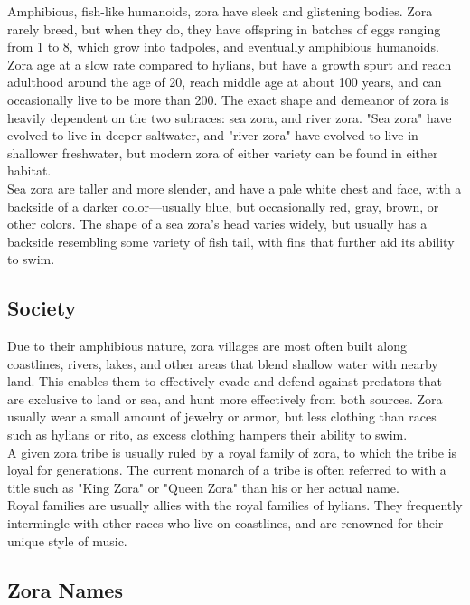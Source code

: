\documentclass[10pt,twoside,twocolumn,openany]{book}
\begin{document}
Amphibious, fish-like humanoids, zora have sleek and glistening bodies. Zora rarely breed, but when they do, they have offspring in batches of eggs ranging from 1 to 8, which grow into tadpoles, and eventually amphibious humanoids. Zora age at a slow rate compared to hylians, but have a growth spurt and reach adulthood around the age of 20, reach middle age at about 100 years, and can occasionally live to be more than 200.
The exact shape and demeanor of zora is heavily dependent on the two subraces: sea zora, and river zora. "Sea zora" have evolved to live in deeper saltwater, and "river zora" have evolved to live in shallower freshwater, but modern zora of either variety can be found in either habitat.\\
Sea zora are taller and more slender, and have a pale white chest and face, with a backside of a darker color—usually blue, but occasionally red, gray, brown, or other colors. The shape of a sea zora's head varies widely, but usually has a backside resembling some variety of fish tail, with fins that further aid its ability to swim.\\

\subsection{Society}

Due to their amphibious nature, zora villages are most often built along coastlines, rivers, lakes, and other areas that blend shallow water with nearby land. This enables them to effectively evade and defend against predators that are exclusive to land or sea, and hunt more effectively from both sources. Zora usually wear a small amount of jewelry or armor, but less clothing than races such as hylians or rito, as excess clothing hampers their ability to swim.\\
A given zora tribe is usually ruled by a royal family of zora, to which the tribe is loyal for generations. The current monarch of a tribe is often referred to with a title such as "King Zora" or "Queen Zora" than his or her actual name.\\
Royal families are usually allies with the royal families of hylians. They frequently intermingle with other races who live on coastlines, and are renowned for their unique style of music.

\subsection{Zora Names}
\end{document}
